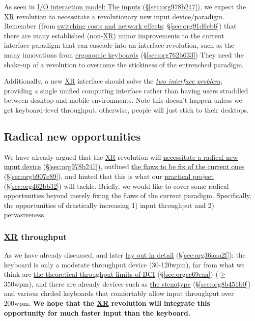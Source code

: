 \documentclass[logo,bsc,singlespacing,parskip]{infthesis}
\begin{document}
As seen in \hyperref[sec:org978b247]{I/O interaction model: The inputs} (\S \ref{sec:org978b247}), we expect the \hyperref[org1d567af]{XR} revolution to necessitate a revolutionary new input device/paradigm.
Remember (from \hyperref[sec:org91d6eb6]{switching costs and network effects}; \S \ref{sec:org91d6eb6}) that there are many established (non-\hyperref[org1d567af]{XR}) minor improvements to the current interface paradigm that
can cascade into an interface revolution, such as the many innovations from \hyperref[sec:org762b633]{ergonomic keyboards} (\S \ref{sec:org762b633})
They need the shake-up of a revolution to overcome the stickiness of the entrenched paradigm.

Additionally, a new \hyperref[org1d567af]{XR} interface should solve the \emph{\hyperref[two interface problem]{two interface problem}}, providing a single unified computing interface rather than having users straddled between desktop and mobile environments.
Note this doesn't happen unless we get keyboard-level throughput, otherwise, people will just stick to their desktops.

\subsection{Radical new opportunities}
\label{sec:org188a752}
We have already argued that the \hyperref[org1d567af]{XR} revolution will \hyperref[sec:org978b247]{necessitate a radical new input device} (\S \ref{sec:org978b247}), outlined \hyperref[sec:orgb907e89]{the flaws to be fix of the current ones} (\S \ref{sec:orgb907e89}), and hinted that this is what our \hyperref[sec:org462bb32]{practical project} (\S \ref{sec:org462bb32}) will tackle.
Briefly, we would like to cover some radical opportunities beyond merely fixing the flaws of the current paradigm.
Specifically, the opportunities of drastically increasing 1) input throughput and 2) pervasiveness.

\subsubsection{\hyperref[org1d567af]{XR} throughput}
\label{sec:orgf86980a}
As we have already discussed, and later \hyperref[sec:org36aaa2f]{lay out in detail} (\S \ref{sec:org36aaa2f}): the keyboard is only a moderate throughput device (30-120wpm), far from what we think are \hyperref[sec:orgcc69caa]{the theoretical throughput limits of BCI} (\S \ref{sec:orgcc69caa}) (\(\ge\)350wpm), and there are already devices such as \hyperref[sec:org8b451b0]{the stenotype} (\S \ref{sec:org8b451b0}) and various chrded keyboards  that comfortably allow input throughput over 200wpm.
\textbf{We hope that the \hyperref[org1d567af]{XR} revolution will integrate this opportunity for much faster input than the keyboard.}
\end{document}
